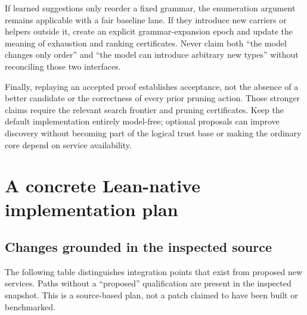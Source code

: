 \documentclass[11pt,a4paper]{article}
\theoremstyle{remark}
\begin{document}
If learned suggestions only reorder a fixed grammar, the enumeration
argument remains applicable with a fair baseline lane. If they introduce
new carriers or helpers outside it, create an explicit grammar-expansion
epoch and update the meaning of exhaustion and ranking certificates. Never
claim both ``the model changes only order'' and ``the model can introduce
arbitrary new types'' without reconciling those two interfaces.

Finally, replaying an accepted proof establishes acceptance, not the absence
of a better candidate or the correctness of every prior pruning action.
Those stronger claims require the relevant search frontier and pruning
certificates. Keep the default implementation entirely model-free; optional
proposals can improve discovery without becoming part of the logical trust
base or making the ordinary core depend on service availability.

\section{A concrete Lean-native implementation plan}
\label{sec:implementation}

\subsection{Changes grounded in the inspected source}

The following table distinguishes integration points that exist from proposed
new services. Paths without a ``proposed'' qualification are present in the
inspected snapshot. This is a source-based plan, not a patch claimed to have
been built or benchmarked.\cite{leantrepo,leantcore,leantgate}
\end{document}
